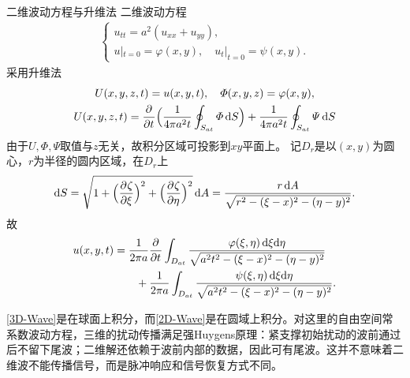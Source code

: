 \begin{example}{二维波动方程与升维法}{}
	二维波动方程
	\begin{align*}
		\begin{cases}
			u_{tt} = a^2(u_{xx} + u_{yy}), \\
			u|_{t=0} = \varphi(x,y),\quad u_t|_{t=0} = \psi(x,y).
		\end{cases}
	\end{align*}
	采用升维法
	\begin{gather*}
		U(x,y,z,t) = u(x,y,t),\quad\varPhi(x,y,z) = \varphi(x,y),\\
		U(x,y,z,t) = \frac{\partial^{}}{\partial{t}^{}}\Bigl(\frac1{4\pi a^2t}\oint_{S_{at}}\varPhi\mathop{}\!\mathrm{d} S\Bigr) + \frac1{4\pi a^2t}\oint_{S_{at}}\varPsi\mathop{}\!\mathrm{d} S
	\end{gather*}
	由于$U,\varPhi,\varPsi$取值与$z$无关，故积分区域可投影到$xy$平面上。
	记$D_r$是以$(x,y)$为圆心，$r$为半径的圆内区域，在$D_r$上
	\[
		\mathop{}\!\mathrm{d} S = \sqrt{1 + \Bigl(\frac{\partial^{}\zeta}{\partial{\xi}^{}}\Bigr)^2 + \Bigl(\frac{\partial^{}\zeta}{\partial{\eta}^{}}\Bigr)^2}\mathop{}\!\mathrm{d} A = \frac{r\mathop{}\!\mathrm{d} A}{\sqrt{r^2 - (\xi - x)^2 - (\eta - y)^2}}.
	\]
	故
	\begin{align}\label{2D-Wave}
		\begin{aligned}
			u(x,y,t) &= \frac1{2\pi a}\frac{\partial^{}}{\partial{t}^{}}\int_{D_{at}}\frac{\varphi(\xi,\eta)\mathop{}\!\mathrm{d}\xi\mathrm{d}\eta}{\sqrt{a^2t^2 - (\xi - x)^2 - (\eta - y)^2}} \\
			&\qquad +\frac1{2\pi a}\int_{D_{at}}\frac{\psi(\xi,\eta)\mathop{}\!\mathrm{d}\xi\mathrm{d}\eta}{\sqrt{a^2t^2 - (\xi - x)^2 - (\eta - y)^2}}.
		\end{aligned}
	\end{align}
\end{example}
\begin{remark}
	\eqref{3D-Wave}是在球面上积分，而\eqref{2D-Wave}是在圆域上积分。对这里的自由空间常系数波动方程，三维的扰动传播满足强Huygens原理：紧支撑初始扰动的波前通过后不留下尾波；二维解还依赖于波前内部的数据，因此可有尾波。这并不意味着二维波不能传播信号，而是脉冲响应和信号恢复方式不同。
\end{remark}
